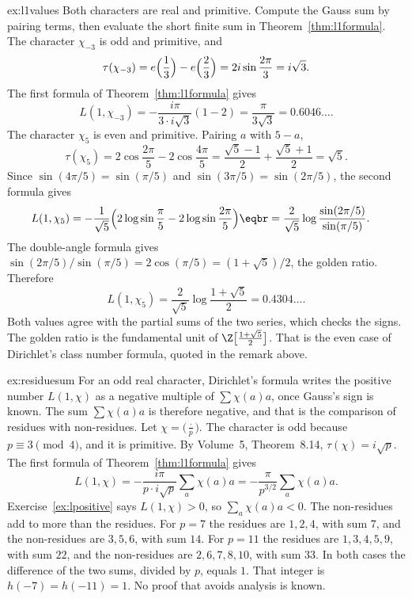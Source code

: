 \begin{solution}{ex:l1values}
\idea Both characters are real and primitive. Compute the Gauss sum by pairing terms, then evaluate the short finite sum in Theorem~\ref{thm:l1formula}.
\writeup The character $\chi_{-3}$ is odd and primitive, and
\[
\tau(\chi_{-3})=e\Bigl(\frac13\Bigr)-e\Bigl(\frac23\Bigr)=2i\sin\frac{2\pi}3=i\sqrt3.
\]
The first formula of Theorem~\ref{thm:l1formula} gives
\[
L(1,\chi_{-3})=-\frac{i\pi}{3\cdot i\sqrt3}(1-2)=\frac\pi{3\sqrt3}=0.6046\ldots.
\]
The character $\chi_5$ is even and primitive. Pairing $a$ with $5-a$,
\[
\tau(\chi_5)=2\cos\frac{2\pi}5-2\cos\frac{4\pi}5=\frac{\sqrt5-1}2+\frac{\sqrt5+1}2=\sqrt5.
\]
Since $\sin(4\pi/5)=\sin(\pi/5)$ and $\sin(3\pi/5)=\sin(2\pi/5)$, the second formula gives
\[
\begin{aligned}L(1,\chi_5)&=-\frac1{\sqrt5}\Bigl(2\log\sin\frac\pi5-2\log\sin\frac{2\pi}5\Bigr)\eqbr=\frac2{\sqrt5}\log\frac{\sin(2\pi/5)}{\sin(\pi/5)}.\end{aligned}
\]
The double-angle formula gives $\sin(2\pi/5)/\sin(\pi/5)=2\cos(\pi/5)=(1+\sqrt5)/2$, the golden ratio. Therefore
\[
L(1,\chi_5)=\frac2{\sqrt5}\log\frac{1+\sqrt5}2=0.4304\ldots.
\]
Both values agree with the partial sums of the two series, which checks the signs. The golden ratio is the fundamental unit of $\Z\bigl[\frac{1+\sqrt5}2\bigr]$. That is the even case of Dirichlet's class number formula, quoted in the remark above.
\end{solution}

\begin{solution}{ex:residuesum}
\idea For an odd real character, Dirichlet's formula writes the positive number $L(1,\chi)$ as a negative multiple of $\sum\chi(a)a$, once Gauss's sign is known. The sum $\sum\chi(a)a$ is therefore negative, and that is the comparison of residues with non-residues.
\writeup Let $\chi=\bigl(\frac\cdot p\bigr)$. The character is odd because $p\equiv3\pmod4$, and it is primitive. By Volume~5, Theorem~8.14, $\tau(\chi)=i\sqrt p$. The first formula of Theorem~\ref{thm:l1formula} gives
\[
L(1,\chi)=-\frac{i\pi}{p\cdot i\sqrt p}\sum_a\chi(a)a=-\frac\pi{p^{3/2}}\sum_a\chi(a)a.
\]
Exercise~\ref{ex:lpositive} says $L(1,\chi)>0$, so $\sum_a\chi(a)a<0$. The non-residues add to more than the residues. For $p=7$ the residues are $1,2,4$, with sum $7$, and the non-residues are $3,5,6$, with sum $14$. For $p=11$ the residues are $1,3,4,5,9$, with sum $22$, and the non-residues are $2,6,7,8,10$, with sum $33$. In both cases the difference of the two sums, divided by $p$, equals $1$. That integer is $h(-7)=h(-11)=1$. No proof that avoids analysis is known.
\end{solution}

